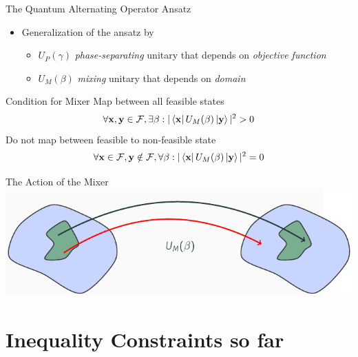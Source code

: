 \documentclass[aspectratio=169]{beamer}
\begin{document}
\begin{frame}{The Quantum Alternating Operator Ansatz}
    \begin{itemize}
        \item Generalization of the ansatz by~\citeauthor{hadfield2019}~\cite{hadfield2019}
        \begin{itemize}
            \item $U_P(\gamma)$ \emph{phase-separating} unitary that depends on
                \emph{objective function}
            \item $U_M(\beta)$ \emph{mixing} unitary that depends on
                \emph{domain}
        \end{itemize}
    \end{itemize}
        \begin{block}{Condition for Mixer}
            Map between all feasible states
        \[
            \forall \mathbf{x}, \mathbf{y} \in \mathcal{F},  \exists \beta :
            |\bra{\mathbf{x}}
            U_M(\beta)  \ket{\mathbf{y}}|^2 > 0
        \]
        Do not map between feasible to non-feasible state
        \[
            \forall \mathbf{x} \in \mathcal{F}, \mathbf{y} \notin \mathcal{F},  \forall \beta :
            |\bra{\mathbf{x}}
            U_M(\beta)  \ket{\mathbf{y}}|^2 = 0
        \]
        \end{block}
\end{frame}

\begin{frame}{The Action of the Mixer}
    \includegraphics[width=\textwidth]{graphics/build/mixer.pdf}
\end{frame}


\section{Inequality Constraints so far}
\end{document}
